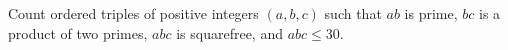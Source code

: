 Count ordered triples of positive integers $(a,b,c)$ such that $ab$ is prime, $bc$ is a product of two primes, $abc$ is squarefree, and $abc\le30$.
